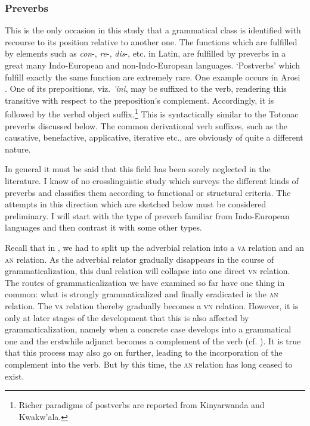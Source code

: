 \subsubsection{Preverbs} \label{sec:3.4.1.6}
This is the only occasion in this study that a grammatical class is identified with recourse to its position relative to another one. The functions which are fulfilled by elements such as \textit{con}{}-, \textit{re}{}-, \textit{dis}{}-, etc. in Latin, are fulfilled by preverbs in a great many Indo-European and non-Indo-European languages. ‘Postverbs’ which fulfill exactly the same function are extremely rare.\label{page105} One example occurs in Arosi \citep[30f]{Capell1971}. One of its prepositions, viz. \textit{'ini}, may be suffixed to the verb, rendering this transitive with respect to the preposition's complement. Accordingly, it is followed by the verbal object suffix.\footnote{Richer paradigms of postverbs are reported from Kinyarwanda and Kwakw'ala.} This is syntactically similar to the Totonac preverbs discussed below. The common derivational verb suffixes, such as the causative, benefactive, applicative, iterative etc., are obviously of quite a different nature.

In general it must be said that this field has been sorely neglected in the literature. I know of no crosslinguistic study which surveys the different kinds of preverbs and classifies them according to functional or structural criteria. The attempts in this direction which are sketched below must be considered preliminary. I will start with the type of preverb familiar from Indo-European languages and then contrast it with some other types.

Recall that in , we had to split up the adverbial relation into a \textsc{va} relation and an \textsc{an} relation. As the adverbial relator gradually disappears in the course of grammaticalization, this dual relation will collapse into one direct \textsc{vn} relation. The routes of grammaticalization we have examined so far have one thing in common: what is strongly grammaticalized and finally eradicated is the \textsc{an} relation. The \textsc{va} relation thereby gradually becomes a \textsc{vn} relation. However, it is only at later stages of the development that this is also affected by grammaticalization, namely when a concrete case develops into a grammatical one and the erstwhile adjunct becomes a complement of the verb (cf. ). It is true that this process may also go on further, leading to the incorporation of the complement into the verb. But by this time, the \textsc{an} relation has long ceased to exist.

